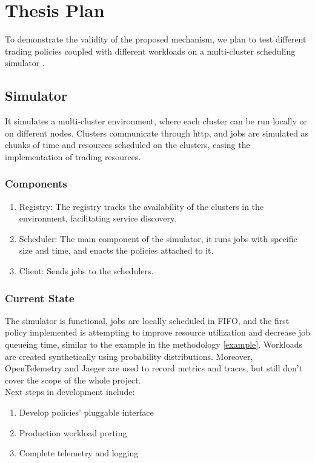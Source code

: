 \section{Thesis Plan}

To demonstrate the validity of the proposed mechanism, we plan to test different trading policies 
coupled with different workloads on a multi-cluster scheduling simulator \cite{sched-github}.

\subsection{Simulator}
It simulates a multi-cluster environment, where each cluster can be run locally or on different nodes. 
Clusters communicate through http, and jobs are simulated as chunks of time and resources scheduled on the clusters, 
easing the implementation of trading resources. 

\subsubsection{Components}
\begin{enumerate}
    \item Registry: The registry tracks the availability of the clusters in the environment, facilitating service discovery. 
    \item Scheduler: The main component of the simulator, it runs jobs with specific size and time, and enacts the policies 
    attached to it.
    \item Client: Sends jobs to the schedulers.
\end{enumerate}
\subsubsection{Current State}
The simulator is functional, jobs are locally scheduled in FIFO, and the first policy implemented 
is attempting to improve resource utilization and decrease job queueing time, similar to the example 
in the methodology \ref{example}. Workloads are created synthetically using probability distributions. 
Moreover, OpenTelemetry \cite{opentelemetry} and Jaeger \cite{jeager} are used to record metrics 
and traces, but still don't cover the scope of the whole project.
\\Next steps in development include:
\begin{enumerate}
    \item Develop policies' pluggable interface
    \item Production workload porting
    \item Complete telemetry and logging
\end{enumerate}

